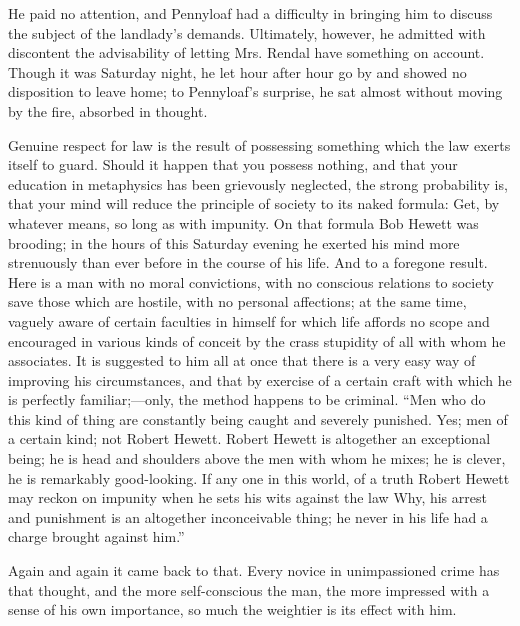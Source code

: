 {}He paid no attention, and Pennyloaf had a difficulty in bringing him
to discuss the subject of the landlady's demands. Ultimately, however,
he admitted with discontent the advisability of letting Mrs. Rendal have
something on account. Though it was Saturday night, he let hour after
hour go by and showed no disposition to leave home; to Pennyloaf's
surprise, he sat almost without moving by the fire, absorbed in thought.

Genuine respect for law is the result of possessing something which the
law exerts itself to guard. Should it happen that you possess nothing,
and that your education in metaphysics has been grievously neglected,
the strong probability is, that your mind will reduce the principle of
society to its naked formula: Get, by whatever means, so long as with
impunity. On that formula Bob Hewett was brooding; in the hours of this
Saturday evening he exerted his mind more strenuously than ever before
in the course of his life. And to a foregone result. Here is a man with
no moral convictions, with no conscious {}relations to society save
those which are hostile, with no personal affections; at the same time,
vaguely aware of certain faculties in himself for which life affords no
scope and encouraged in various kinds of conceit by the crass stupidity
of all with whom he associates. It is suggested to him all at once that
there is a very easy way of improving his circumstances, and that by
exercise of a certain craft with which he is perfectly familiar;---only,
the method happens to be criminal. ``Men who do this kind of thing are
constantly being caught and severely punished. Yes; men of a certain
kind; not Robert Hewett. Robert Hewett is altogether an exceptional
being; he is head and shoulders above the men with whom he mixes; he is
clever, he is remarkably good-looking. If any one in this world, of a
truth Robert Hewett may reckon on impunity when he sets his wits against
the law Why, his arrest and punishment is an altogether inconceivable
thing; he never in his life had a charge brought against him.''

{}Again and again it came back to that. Every novice in unimpassioned
crime has that thought, and the more self-conscious the man, the more
impressed with a sense of his own importance, so much the weightier is
its effect with him.

